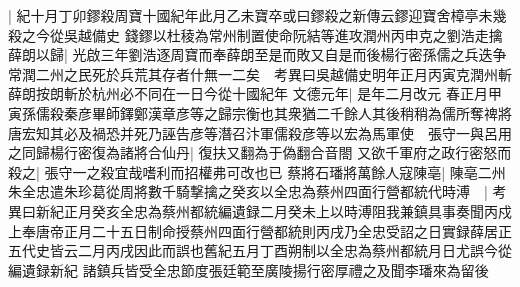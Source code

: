 |{
	紀十月丁卯鏐殺周寶十國紀年此月乙未寶卒或曰鏐殺之新傳云鏐迎寶舍樟亭未幾殺之今從吳越備史}
錢鏐以杜稜為常州制置使命阮結等進攻潤州丙申克之劉浩走擒薛朗以歸|{
	光啟三年劉浩逐周寶而奉薛朗至是而敗又自是而後楊行密孫儒之兵迭争常潤二州之民死於兵荒其存者什無一二矣　考異曰吳越備史明年正月丙寅克潤州斬薛朗按朗斬於杭州必不同在一日今從十國紀年}
文德元年|{
	是年二月改元}
春正月甲寅孫儒殺秦彦畢師鐸鄭漢章彦等之歸宗衡也其衆猶二千餘人其後稍稍為儒所奪禆將唐宏知其必及禍恐并死乃誣告彦等潛召汴軍儒殺彦等以宏為馬軍使　張守一與呂用之同歸楊行密復為諸將合仙丹|{
	復扶又翻為于偽翻合音閤}
又欲千軍府之政行密怒而殺之|{
	張守一之殺宜哉嗜利而招權弗可改也已}
蔡將石璠將萬餘人寇陳亳|{
	陳亳二州}
朱全忠遣朱珍葛從周將數千騎撃擒之癸亥以全忠為蔡州四面行營都統代時溥　|{
	考異曰新紀正月癸亥全忠為蔡州都統編遺録二月癸未上以時溥阻我兼鎮具事奏聞丙戍上奉唐帝正月二十五日制命授蔡州四面行營都統則丙戌乃全忠受詔之日實録薛居正五代史皆云二月丙戌因此而誤也舊紀五月丁酉朔制以全忠為蔡州都統月日尤誤今從編遺録新紀}
諸鎮兵皆受全忠節度張廷範至廣陵揚行密厚禮之及聞李璠來為留後

